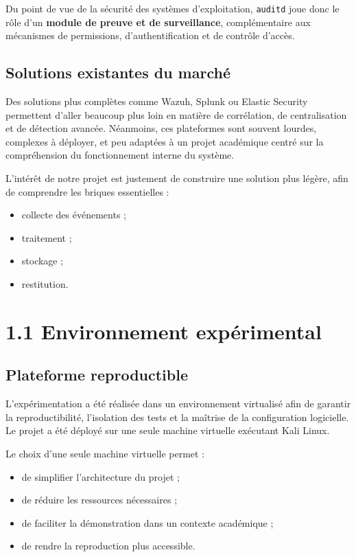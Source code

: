 \documentclass[12pt,a4paper]{article}
\begin{document}
Du point de vue de la sécurité des systèmes d’exploitation, \texttt{auditd} joue donc le rôle d’un \textbf{module de preuve et de surveillance}, complémentaire aux mécanismes de permissions, d’authentification et de contrôle d’accès.

\subsection{Solutions existantes du marché}

Des solutions plus complètes comme Wazuh, Splunk ou Elastic Security permettent d’aller beaucoup plus loin en matière de corrélation, de centralisation et de détection avancée. Néanmoins, ces plateformes sont souvent lourdes, complexes à déployer, et peu adaptées à un projet académique centré sur la compréhension du fonctionnement interne du système.

L’intérêt de notre projet est justement de construire une solution plus légère, afin de comprendre les briques essentielles :
\begin{itemize}
    \item collecte des événements ;
    \item traitement ;
    \item stockage ;
    \item restitution.
\end{itemize}

\section{1.1 Environnement expérimental}

\subsection{Plateforme reproductible}

L’expérimentation a été réalisée dans un environnement virtualisé afin de garantir la reproductibilité, l’isolation des tests et la maîtrise de la configuration logicielle. Le projet a été déployé sur une seule machine virtuelle exécutant Kali Linux.

Le choix d’une seule machine virtuelle permet :
\begin{itemize}
    \item de simplifier l’architecture du projet ;
    \item de réduire les ressources nécessaires ;
    \item de faciliter la démonstration dans un contexte académique ;
    \item de rendre la reproduction plus accessible.
\end{itemize}
\end{document}
